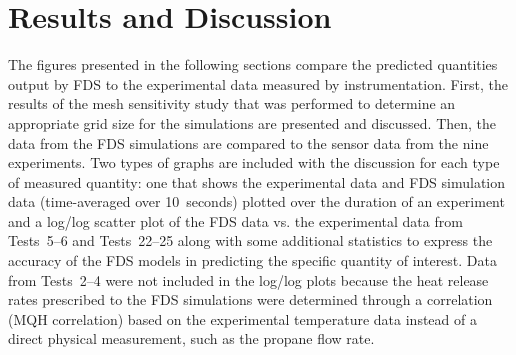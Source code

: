 \renewcommand{\thechapter}{5}

\chapter{Results and Discussion}
\label{chap:results_disc}
The figures presented in the following sections compare the predicted quantities output by FDS to the experimental data measured by instrumentation. First, the results of the mesh sensitivity study that was performed to determine an appropriate grid size for the simulations are presented and discussed. Then, the data from the FDS simulations are compared to the sensor data from the nine experiments. Two types of graphs are included with the discussion for each type of measured quantity: one that shows the experimental data and FDS simulation data (time-averaged over 10~seconds) plotted over the duration of an experiment and a log/log scatter plot of the FDS data vs. the experimental data from Tests~5--6 and Tests~22--25 along with some additional statistics to express the accuracy of the FDS models in predicting the specific quantity of interest. Data from Tests~2--4 were not included in the log/log plots because the heat release rates prescribed to the FDS simulations were determined through a correlation (MQH correlation) based on the experimental temperature data instead of a direct physical measurement, such as the propane flow rate.

